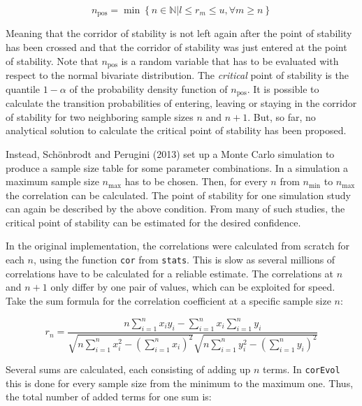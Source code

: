 \begin{equation}
n_\mathrm{pos}=\min{\left\{ n\in \mathbb{N}|l\leq r_{m}\leq u,\forall m\geq n\right\}} \label{eq:pos}
\end{equation}

Meaning that the corridor of stability is not left again after the point of stability has been crossed and that the corridor of stability was just entered at the point of stability. Note that \(n_\mathrm{pos}\) is a random variable that has to be evaluated with respect to the normal bivariate distribution. The \emph{critical} point of stability is the quantile \(1-\alpha\) of the probability density function of \(n_\mathrm{pos}\). It is possible to calculate the transition probabilities of entering, leaving or staying in the corridor of stability for two neighboring sample sizes \(n\) and \(n+1\). But, so far, no analytical solution to calculate the critical point of stability has been proposed.

Instead, Schönbrodt and Perugini (2013) set up a Monte Carlo simulation to produce a sample size table for some parameter combinations. In a simulation a maximum sample size \(n_\mathrm{max}\) has to be chosen. Then, for every \(n\) from \(n_\mathrm{min}\) to \(n_\mathrm{max}\) the correlation can be calculated. The point of stability for one simulation study can again be described by the above condition. From many of such studies, the critical point of stability can be estimated for the desired confidence.

In the original implementation, the correlations were calculated from scratch for each \(n\), using the function \texttt{cor} from \texttt{stats}. This is slow as several millions of correlations have to be calculated for a reliable estimate. The correlations at \(n\) and \(n+1\) only differ by one pair of values, which can be exploited for speed. Take the sum formula for the correlation coefficient at a specific sample size \(n\):

\begin{equation}
r_{n} = \frac{n\sum_{i=1}^{n} x_i y_i - \sum_{i=1}^{n} x_i \sum_{i=1}^{n} y_i}
{\sqrt{n\sum_{i=1}^{n} x_i^2-\left(\sum_{i=1}^{n} x_i\right)^2}
\sqrt{n\sum_{i=1}^{n} y_i^2-\left(\sum_{i=1}^{n} y_i\right)^2}}
  \label{eq:sumformula}
\end{equation}

Several sums are calculated, each consisting of adding up \(n\) terms. In \texttt{corEvol} this is done for every sample size from the minimum to the maximum one. Thus, the total number of added terms for one sum is:

